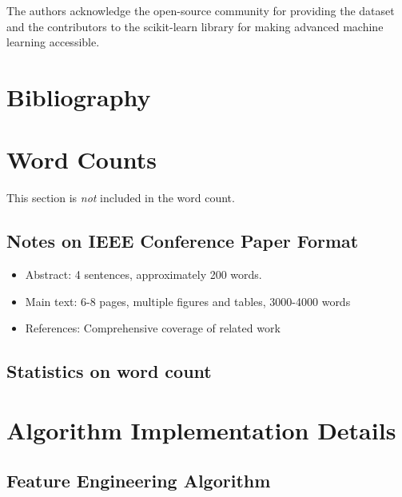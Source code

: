 \documentclass[times, twoside, watermark]{zHenriquesLab-StyleBioRxiv}
\begin{document}
\begin{acknowledgements}
The authors acknowledge the open-source community for providing the dataset and the contributors to the scikit-learn library for making advanced machine learning accessible.
\end{acknowledgements}

\section*{Bibliography}


\onecolumn
\newpage

\section*{Word Counts}
This section is \textit{not} included in the word count. 

\subsection*{Notes on IEEE Conference Paper Format}
\begin{itemize}
\item Abstract: 4 sentences, approximately 200 words.
\item Main text: 6-8 pages, multiple figures and tables, 3000-4000 words
\item References: Comprehensive coverage of related work
\end{itemize}

\subsection*{Statistics on word count}
\detailtexcount
\newpage

\captionsetup*{format=largeformat}

\section{Algorithm Implementation Details} \label{note:algorithms}

\subsection*{Feature Engineering Algorithm}
\end{document}
